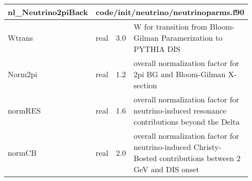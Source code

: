 \documentclass{article}
\begin{document}
\begin{longtable}{llll}
\toprule
\textbf{\large{nl\_Neutrino2piBack}} & \multicolumn{3}{l}{\footnotesize{code/init/neutrino/neutrinoparms.f90}}\\*
\midrule
\endfirsthead
\midrule
\endhead
Wtrans & \begin{minipage}[t]{2cm}real\end{minipage} & \begin{minipage}[t]{2cm}3.0\end{minipage} & \begin{minipage}[t]{12cm}W for transition from Bloom-Gilman Paramerization to PYTHIA DIS\end{minipage}\\*
\midrule
Norm2pi & \begin{minipage}[t]{2cm}real\end{minipage} & \begin{minipage}[t]{2cm}1.2\end{minipage} & \begin{minipage}[t]{12cm}overall normalization factor for 2pi BG and Bloom-Gilman X-section\end{minipage}\\*
\midrule
normRES & \begin{minipage}[t]{2cm}real\end{minipage} & \begin{minipage}[t]{2cm}1.6\end{minipage} & \begin{minipage}[t]{12cm}overall normalization factor for neutrino-induced resonance contributions beyond the Delta\end{minipage}\\*
\midrule
normCB & \begin{minipage}[t]{2cm}real\end{minipage} & \begin{minipage}[t]{2cm}2.0\end{minipage} & \begin{minipage}[t]{12cm}overall normalization factor for neutrino-induced Christy-Bosted contributions between 2 GeV and DIS onset\end{minipage}\\*
\bottomrule
\end{longtable}
{ }



\end{document}
